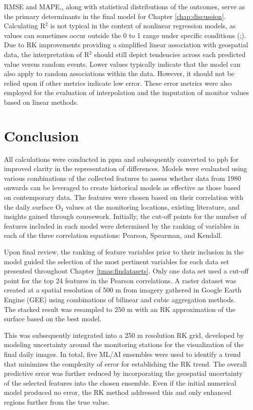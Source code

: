 RMSE and MAPE,, along with statistical distributions of the outcomes, serve as the primary determinants in the final model for Chapter \ref{chap:discussion}. Calculating R$^2$ is not typical in the context of nonlinear regression models, as values can sometimes occur outside the 0 to 1 range under specific conditions (\cite{mu_estimation_2023};\cite{zhang_deep_2023}). Due to RK improvements providing a simplified linear association with geospatial data, the interpretation of R$^2$ should still depict tendencies across each predicted value versus random events. Lower values typically indicate that the model can also apply to random associations within the data. However, it should not be relied upon if other metrics indicate low error. These error metrics were also employed for the evaluation of interpolation and the imputation of monitor values based on linear methods.
\section{Conclusion} \label{methods:conclusion} All calculations were conducted in ppm and subsequently converted to ppb for improved clarity in the representation of differences. Models were evaluated using various combinations of the collected features to assess whether data from 1980 onwards can be leveraged to create historical models as effective as those based on contemporary data. The features were chosen based on their correlation with the daily surface O$_3$ values at the monitoring locations, existing literature, and insights gained through coursework. Initially, the cut-off points for the number of features included in each model were determined by the ranking of variables in each of the three correlation equations: Pearson, Spearman, and Kendall. 

Upon final review, the ranking of feature variables prior to their inclusion in the model guided the selection of the most pertinent variables for each data set presented throughout Chapter \ref{tmas:findatasets}. Only one data set used a cut-off point for the top 24 features in the Pearson correlations. A raster dataset was created at a spatial resolution of 500 m from imagery gathered in Google Earth Engine (GEE) using combinations of bilinear and cubic aggregation methods. The stacked result was resampled to 250 m with an RK approximation of the surface based on the best model. 

This was subsequently integrated into a 250 m resolution RK grid, developed by modeling uncertainty around the monitoring stations for the visualization of the final daily images. In total, five ML/AI ensembles were used to identify a trend that minimizes the complexity of error for establishing the RK trend. The overall predictive error was further reduced by incorporating the geospatial uncertainty of the selected features into the chosen ensemble. Even if the initial numerical model produced no error, the RK method addressed this and only enhanced regions further from the true value. 